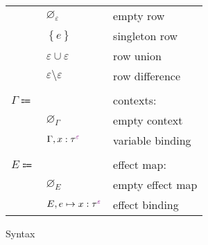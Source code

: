 \documentclass[12pt]{article}
\newcommand\anno[2]{#1 : #2}
\newcommand\evar{x}
\newcommand\tembellished[2]{{#1}^{\textcolor{violet}{#2}}}
\newcommand\type{\tau}
\newcommand\row{\varepsilon}
\newcommand\rempty{\varnothing_{\row}}
\newcommand\rsingleton[1]{\left\{ #1 \right\}}
\newcommand\runion[2]{#1 \cup #2}
\newcommand\rdiff[2]{#1 \setminus #2}
\newcommand\context{\Gamma}
\newcommand\cempty{\varnothing_{\context}}
\newcommand\cextend[2]{#1, #2}
\newcommand\effect{e}
\newcommand\effectmap{E}
\newcommand\emempty{\varnothing_{\effectmap}}
\newcommand\emmap[2]{#1 \mapsto #2}
\newcommand\emextend[2]{#1, #2}
\begin{document}
\begin{figure}[H]
\begin{mdframed}[backgroundcolor=none]
\begin{center}
\begin{tabular}{l l l}
              & $\rempty$ & empty row \\
              & $\rsingleton{\effect}$ & singleton row \\
              & $\runion{\row}{\row}$ & row union \\
              & $\rdiff{\row}{\row}$ & row difference \\
              \\
              $\context \Coloneqq$ & & contexts: \\
              & $\cempty$ & empty context \\
              & $\cextend{\context}{\anno{\evar}{\tembellished{\type}{\row}}}$ & variable binding \\
              \\
              $\effectmap \Coloneqq$ & & effect map: \\
              & $\emempty$ & empty effect map \\
              & $\emextend{\effectmap}{\emmap{\effect}{\anno{\evar}{\tembellished{\type}{\row}}}}$ & effect binding \\
            \end{tabular}
          \end{center}

          \caption{Syntax}\label{fig:syntax}
        \end{mdframed}
      \end{figure}
\end{document}

